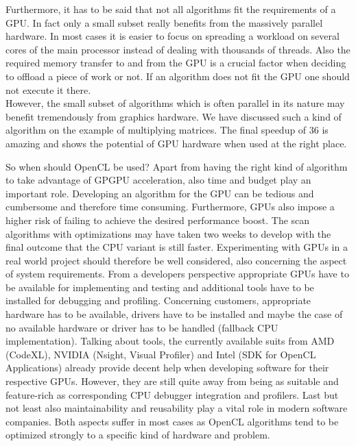 Furthermore, it has to be said that not all algorithms fit the requirements of a GPU. In fact only a small subset really benefits from the massively parallel hardware. In most cases it is easier to focus on spreading a workload on several cores of the main processor instead of dealing with thousands of threads. Also the required memory transfer to and from the GPU is a crucial factor when deciding to offload a piece of work or not. If an algorithm does not fit the GPU one should not execute it there. \\
However, the small subset of algorithms which is often parallel in its nature may benefit tremendously from graphics hardware. We have discussed such a kind of algorithm on the example of multiplying matrices. The final speedup of 36 is amazing and shows the potential of GPU hardware when used at the right place.

So when should OpenCL be used? Apart from having the right kind of algorithm to take advantage of GPGPU acceleration, also time and budget play an important role. Developing an algorithm for the GPU can be tedious and cumbersome and therefore time consuming. Furthermore, GPUs also impose a higher risk of failing to achieve the desired performance boost. The scan algorithms with optimizations may have taken two weeks to develop with the final outcome that the CPU variant is still faster. Experimenting with GPUs in a real world project should therefore be well considered, also concerning the aspect of system requirements. From a developers perspective appropriate GPUs have to be available for implementing and testing and additional tools have to be installed for debugging and profiling. Concerning customers, appropriate hardware has to be available, drivers have to be installed and maybe the case of no available hardware or driver has to be handled (fallback CPU implementation). Talking about tools, the currently available suits from AMD (CodeXL), NVIDIA (Nsight, Visual Profiler) and Intel (SDK for OpenCL Applications) already provide decent help when developing software for their respective GPUs. However, they are still quite away from being as suitable and feature-rich as corresponding CPU debugger integration and profilers. Last but not least also maintainability and reusability play a vital role in modern software companies. Both aspects suffer in most cases as OpenCL algorithms tend to be optimized strongly to a specific kind of hardware and problem.

